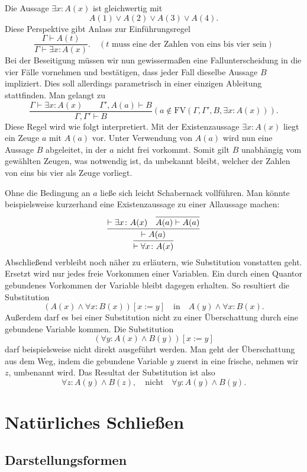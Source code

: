 Die Aussage $\exists x\colon A(x)$ ist gleichwertig mit
\[A(1)\lor A(2)\lor A(3)\lor A(4).\]
Diese Perspektive gibt Anlass zur Einführungsregel
\[\dfrac{\Gamma\vdash A(t)}{\Gamma\vdash\exists x\colon A(x)}.\quad
(\text{$t$ muss eine der Zahlen von eins bis vier sein})\]
Bei der Beseitigung müssen wir nun gewissermaßen eine Fallunterscheidung
in die vier Fälle vornehmen und bestätigen, dass jeder Fall dieselbe
Aussage $B$ impliziert. Dies soll allerdings parametrisch in einer
einzigen Ableitung stattfinden. Man gelangt zu
\[\dfrac{\Gamma\vdash\exists x\colon A(x)\qquad\Gamma',A(a)\vdash B}
{\Gamma,\Gamma'\vdash B}(a\notin\mathrm{FV}(\Gamma,\Gamma',B,\exists x\colon A(x))).\]
Diese Regel wird wie folgt interpretiert. Mit der Existenzaussage
$\exists x\colon A(x)$ liegt ein Zeuge $a$ mit $A(a)$ vor. Unter
Verwendung von $A(a)$ wird nun eine Aussage $B$ abgeleitet, in der $a$
nicht frei vorkommt. Somit gilt $B$ unabhängig vom gewählten Zeugen,
was notwendig ist, da unbekannt bleibt, welcher der Zahlen von eins
bis vier als Zeuge vorliegt.

Ohne die Bedingung an $a$ ließe sich leicht Schabernack vollführen.
Man könnte beispielsweise kurzerhand eine Existenzaussage zu einer
Allaussage machen:
\[\infer{\vdash\forall x\colon A(x)}{
  \infer{\vdash A(a)}{
    \vdash \exists x\colon A(x)
  & \infer{A(a)\vdash A(a)}{}}}\]
Abschließend verbleibt noch näher zu erläutern, wie Substitution
vonstatten geht. Ersetzt wird nur jedes freie Vorkommen einer
Variablen. Ein durch einen Quantor gebundenes Vorkommen der Variable
bleibt dagegen erhalten. So resultiert die Substitution
\[(A(x)\land\forall x: B(x))[x:=y]\quad\text{in}\quad
A(y)\land\forall x\colon B(x).\]
Außerdem darf es bei einer Substitution nicht zu einer Überschattung
durch eine gebundene Variable kommen. Die Substitution
\[(\forall y\colon A(x)\land B(y))[x:=y]\]
darf beispielsweise nicht direkt ausgeführt werden. Man geht der
Überschattung aus dem Weg, indem die gebundene Variable $y$ zuerst
in eine frische, nehmen wir $z$, umbenannt wird. Das Resultat der
Substitution ist also
\[\forall z\colon A(y)\land B(z),\quad\text{nicht}\quad
\forall y\colon A(y)\land B(y).\]

\newpage
\section{Natürliches Schließen}

\subsection{Darstellungsformen}

